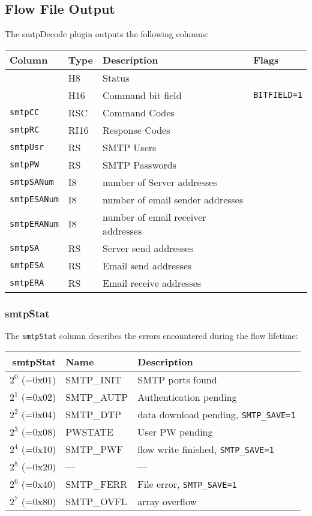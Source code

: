 \documentclass[documentation]{subfiles}
\begin{document}
\subsection{Flow File Output}
The smtpDecode plugin outputs the following columns:
\begin{longtable}{llll}
    \toprule
    {\bf Column} & {\bf Type} & {\bf Description} & {\bf Flags}\\
    \midrule\endhead%
    {\tt \nameref{smtpStat}} & H8 & Status \\
    {\tt \nameref{smtpCBF}} & H16 & Command bit field & {\tt BITFIELD=1}\\
    {\tt smtpCC} & RSC & Command Codes \\
    {\tt smtpRC} & RI16 & Response Codes \\
    {\tt smtpUsr} & RS & SMTP Users \\
    {\tt smtpPW} & RS & SMTP Passwords \\
    {\tt smtpSANum} & I8 & number of Server addresses \\
    {\tt smtpESANum} & I8 & number of email sender addresses \\
    {\tt smtpERANum} & I8 & number of email receiver addresses \\
    {\tt smtpSA} & RS & Server send addresses \\
    {\tt smtpESA} & RS & Email send addresses \\
    {\tt smtpERA} & RS & Email receive addresses \\
    \bottomrule
\end{longtable}

\subsubsection{smtpStat}\label{smtpStat}
The {\tt smtpStat} column describes the errors encountered during the flow lifetime:
\begin{longtable}{rll}
    \toprule
    {\bf smtpStat} & {\bf Name} & {\bf Description} \\
    \midrule\endhead%
    $2^0$ (=0x01) & SMTP\_INIT & SMTP ports found\\
    $2^1$ (=0x02) & SMTP\_AUTP & Authentication pending\\
    $2^2$ (=0x04) & SMTP\_DTP & data download pending, {\tt SMTP\_SAVE=1}\\
    $2^3$ (=0x08) & PWSTATE & User PW pending\\
    $2^4$ (=0x10) & SMTP\_PWF & flow write finished, {\tt SMTP\_SAVE=1}\\
    $2^5$ (=0x20) & --- & --- \\
    $2^6$ (=0x40) & SMTP\_FERR & File error, {\tt SMTP\_SAVE=1}\\
    $2^7$ (=0x80) & SMTP\_OVFL & array overflow \\
    \bottomrule
\end{longtable}
\end{document}
